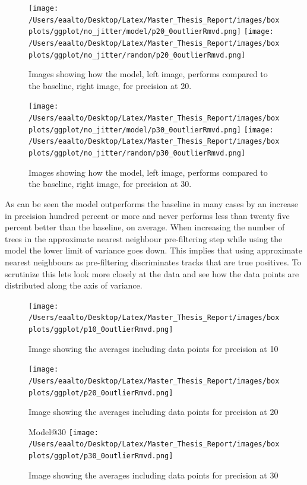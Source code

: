 \documentclass[a4paper,11pt]{kth-mag}
\begin{document}
\begin{figure}
\texttt{[image: /Users/eaalto/Desktop/Latex/Master\_Thesis\_Report/images/boxplots/ggplot/no\_jitter/model/p20\_0outlierRmvd.png]}
\texttt{[image: /Users/eaalto/Desktop/Latex/Master\_Thesis\_Report/images/boxplots/ggplot/no\_jitter/random/p20\_0outlierRmvd.png]}
\caption{Images showing how the model, left image, performs compared to the baseline, right image, for precision at 20.}
\end{figure}

\begin{figure}
\texttt{[image: /Users/eaalto/Desktop/Latex/Master\_Thesis\_Report/images/boxplots/ggplot/no\_jitter/model/p30\_0outlierRmvd.png]}
\texttt{[image: /Users/eaalto/Desktop/Latex/Master\_Thesis\_Report/images/boxplots/ggplot/no\_jitter/random/p30\_0outlierRmvd.png]}
\caption{Images showing how the model, left image, performs compared to the baseline, right image, for precision at 30.}
\end{figure}

As can be seen the model outperforms the baseline in many cases by an increase in precision hundred percent or more and never performs less than twenty five percent better than the baseline, on average. 
When increasing the number of trees in the approximate nearest neighbour pre-filtering step while using the model the lower limit of variance goes down. This implies that using approximate nearest neighbours as pre-filtering discriminates tracks that are true positives. To scrutinize this lets look more closely at the data and see how the data points are distributed along the axis of variance.

\begin{figure}
\texttt{[image: /Users/eaalto/Desktop/Latex/Master\_Thesis\_Report/images/boxplots/ggplot/p10\_0outlierRmvd.png]}

\caption{Image showing the averages including data points for precision at 10}
\end{figure}

\begin{figure}
\texttt{[image: /Users/eaalto/Desktop/Latex/Master\_Thesis\_Report/images/boxplots/ggplot/p20\_0outlierRmvd.png]}
\caption{Image showing the averages including data points for precision at 20}
\end{figure}


\begin{figure}
Model@30
\texttt{[image: /Users/eaalto/Desktop/Latex/Master\_Thesis\_Report/images/boxplots/ggplot/p30\_0outlierRmvd.png]}
\caption{Image showing the averages including data points for precision at 30}
\end{figure}
\end{document}
